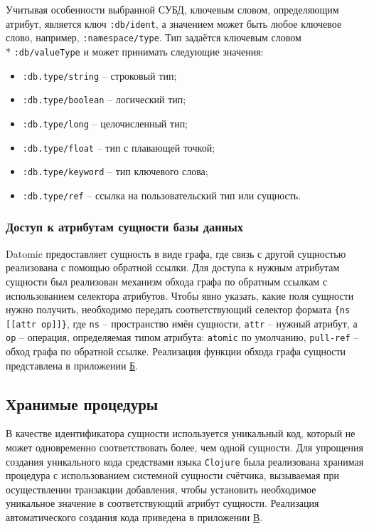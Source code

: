 Учитывая особенности выбранной СУБД, ключевым словом, определяющим атрибут, является ключ \texttt{:db/ident}, а значением может быть любое ключевое слово, например, \texttt{:namespace/type}. Тип задаётся ключевым словом \\* \texttt{:db/valueType} и может принимать следующие значения:
\begin{itemize}
	\item \texttt{:db.type/string} -- строковый тип;
	\item \texttt{:db.type/boolean} -- логический тип;
	\item \texttt{:db.type/long} -- целочисленный тип;
	\item \texttt{:db.type/float} -- тип с плавающей точкой;
	\item \texttt{:db.type/keyword} -- тип ключевого слова;
	\item \texttt{:db.type/ref} -- ссылка на пользовательский тип или сущность.
\end{itemize}

\subsubsection{Доступ к атрибутам сущности базы данных}

Datomic предоставляет сущность в виде графа, где связь с другой сущностью реализована с помощью обратной ссылки. Для доступа к нужным атрибутам сущности был реализован механизм обхода графа по обратным ссылкам с использованием селектора атрибутов. Чтобы явно указать, какие поля сущности нужно получить, необходимо передать соответствующий селектор формата \texttt{\{ns [[attr op]]\}}, где \texttt{ns} -- пространство имён сущности, \texttt{attr} -- нужный атрибут, а \texttt{op} -- операция, определяемая типом атрибута: \texttt{atomic} по умолчанию, \texttt{pull-ref} -- обход графа по обратной ссылке. Реализация функции обхода графа сущности представлена в приложении \hyperref[app:db]{Б}.

\subsection{Хранимые процедуры}

В качестве идентификатора сущности используется уникальный код, который не может одновременно соответствовать более, чем одной сущности. Для упрощения создания уникального кода средствами языка \texttt{Clojure} была реализована хранимая процедура с использованием системной сущности счётчика, вызываемая при осуществлении транзакции добавления, чтобы установить необходимое уникальное значение в соответствующий атрибут сущности. Реализация автоматического создания кода приведена в приложении \hyperref[app:fns]{В}.

